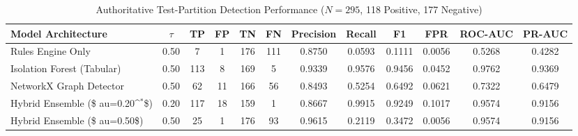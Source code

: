 \begin{table}[t]
\centering
\caption{Authoritative Test-Partition Detection Performance ($N=295$, 118 Positive, 177 Negative)}
\label{tab:detection_performance}
\begin{tabular}{lccccccccccc}
\toprule
\textbf{Model Architecture} & \textbf{$\tau$} & \textbf{TP} & \textbf{FP} & \textbf{TN} & \textbf{FN} & \textbf{Precision} & \textbf{Recall} & \textbf{F1} & \textbf{FPR} & \textbf{ROC-AUC} & \textbf{PR-AUC} \\
\midrule
Rules Engine Only & 0.50 & 7 & 1 & 176 & 111 & 0.8750 & 0.0593 & 0.1111 & 0.0056 & 0.5268 & 0.4282 \\
Isolation Forest (Tabular) & 0.50 & 113 & 8 & 169 & 5 & 0.9339 & 0.9576 & 0.9456 & 0.0452 & 0.9762 & 0.9369 \\
NetworkX Graph Detector & 0.50 & 62 & 11 & 166 & 56 & 0.8493 & 0.5254 & 0.6492 & 0.0621 & 0.7322 & 0.6479 \\
Hybrid Ensemble (\$	au=0.20^$^*$\$) & 0.20 & 117 & 18 & 159 & 1 & 0.8667 & 0.9915 & 0.9249 & 0.1017 & 0.9574 & 0.9156 \\
Hybrid Ensemble (\$	au=0.50\$) & 0.50 & 25 & 1 & 176 & 93 & 0.9615 & 0.2119 & 0.3472 & 0.0056 & 0.9574 & 0.9156 \\
\bottomrule
\end{tabular}
\end{table}
